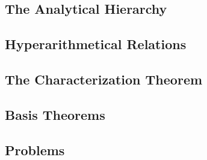 
\subsection{The Analytical Hierarchy}


\subsection{Hyperarithmetical Relations}


\subsection{The Characterization Theorem}


\subsection{Basis Theorems}


\subsection{Problems}
